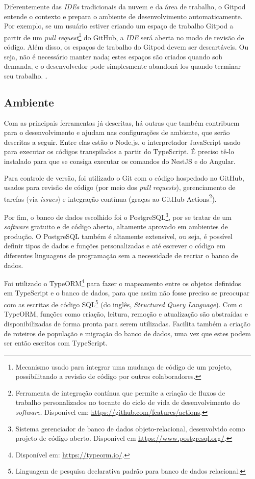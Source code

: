 Diferentemente das \textit{IDEs} tradicionais da nuvem e da área de trabalho, o Gitpod entende o contexto e prepara o ambiente de desenvolvimento automaticamente. Por exemplo, se um usuário estiver criando um espaço de trabalho Gitpod a partir de um \textit{pull request}\footnote{Mecanismo usado para integrar uma mudança de código de um projeto, possibilitando a revisão de código por outros colaboradores.} do GitHub, a \textit{IDE} será aberta no modo de revisão de código. Além disso, os espaços de trabalho do Gitpod devem ser descartáveis. Ou seja, não é necessário manter nada; estes espaços são criados quando sob demanda, e o desenvolvedor pode simplesmente abandoná-los quando terminar seu trabalho. \cite{typefox2020Gitpod}.

\subsection{Ambiente}
\label{ssec:Ambiente}
Com as principais ferramentas já descritas, há outras que também contribuem para o desenvolvimento e ajudam nas configurações de ambiente, que serão descritas a seguir. Entre elas estão o Node.js, o interpretador JavaScript usado para executar os códigos transpilados a partir do TypeScript. É preciso tê-lo instalado para que se consiga executar os comandos do NestJS e do Angular.

Para controle de versão, foi utilizado o Git com o código hospedado no GitHub, usados para revisão de código (por meio dos \textit{pull requests}), gerenciamento de tarefas (via \textit{issues}) e integração contínua (graças ao GitHub Actions\footnote{Ferramenta de integração contínua que permite a criação de fluxos de trabalho personalizados no tocante do ciclo de vida de desenvolvimento do \textit{software}. Disponível em: \url{https://github.com/features/actions}.}).

Por fim, o banco de dados escolhido foi o PostgreSQL\footnote{Sistema gerenciador de banco de dados objeto-relacional, desenvolvido como projeto de código aberto. Disponível em \url{https://www.postgresql.org/}.}, por se tratar de um \textit{software} gratuito e de código aberto, altamente aprovado em ambientes de produção. O PostgreSQL também é altamente extensível, ou seja, é possível definir tipos de dados e funções personalizadas e até escrever o código em diferentes linguagens de programação sem a necessidade de recriar o banco de dados.

Foi utilizado o TypeORM\footnote{Disponível em: \url{https://typeorm.io/}.} para fazer o mapeamento entre os objetos definidos em TypeScript e o banco de dados, para que assim não fosse preciso se preocupar com as escritas de código SQL\footnote{Linguagem de pesquisa declarativa padrão para banco de dados relacional.} (do inglês, \textit{Structured Query Language}). Com o TypeORM, funções como criação, leitura, remoção e atualização são abstraídas e disponibilizadas de forma pronta para serem utilizadas. Facilita também a criação de roteiros de população e migração do banco de dados, uma vez que estes podem ser então escritos com TypeScript.
